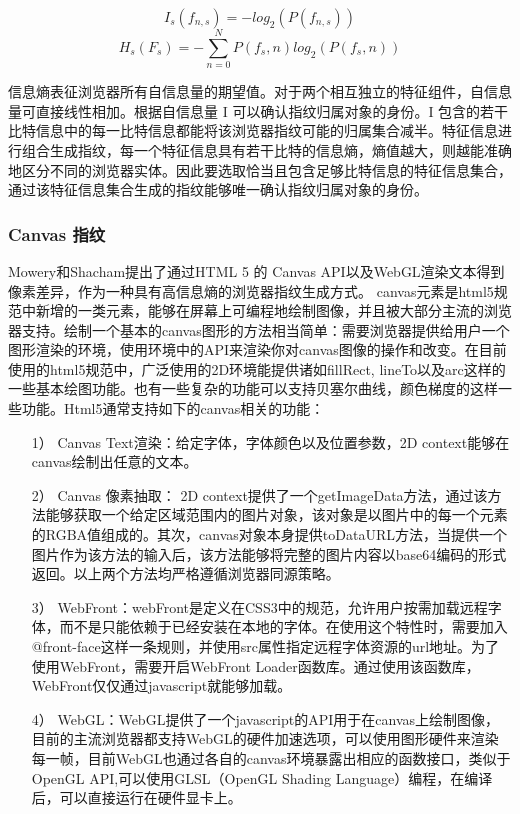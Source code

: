 \documentclass[doctor,privacy,twoside]{buaa_mac}
\begin{document}
\begin{equation}
I_s(f_{n,s})=-log_2(P(f_{n,s})) 
\end{equation}
\begin{equation}
H_s(F_s)=-\sum_{n=0}^{N}P(f_s,n)log_2(P(f_s,n)) 
\end{equation}


信息熵表征浏览器所有自信息量的期望值。对于两个相互独立的特征组件，自信息量可直接线性相加。根据自信息量 I 可以确认指纹归属对象的身份。I 包含的若干比特信息中的每一比特信息都能将该浏览器指纹可能的归属集合减半。特征信息进行组合生成指纹，每一个特征信息具有若干比特的信息熵，熵值越大，则越能准确地区分不同的浏览器实体。因此要选取恰当且包含足够比特信息的特征信息集合，通过该特征信息集合生成的指纹能够唯一确认指纹归属对象的身份。



\subsubsection{Canvas 指纹}
Mowery和Shacham提出了通过HTML 5 的 Canvas API以及WebGL渲染文本得到像素差异，作为一种具有高信息熵的浏览器指纹生成方式。
canvas元素是html5规范中新增的一类元素，能够在屏幕上可编程地绘制图像，并且被大部分主流的浏览器支持。绘制一个基本的canvas图形的方法相当简单：需要浏览器提供给用户一个图形渲染的环境，使用环境中的API来渲染你对canvas图像的操作和改变。在目前使用的html5规范中，广泛使用的2D环境能提供诸如fillRect, lineTo以及arc这样的一些基本绘图功能。也有一些复杂的功能可以支持贝塞尔曲线，颜色梯度的这样一些功能。Html5通常支持如下的canvas相关的功能：

\begin{itemize}
\item[1）] Canvas Text渲染：给定字体，字体颜色以及位置参数，2D context能够在canvas绘制出任意的文本。
\item[2）] Canvas 像素抽取： 2D context提供了一个getImageData方法，通过该方法能够获取一个给定区域范围内的图片对象，该对象是以图片中的每一个元素的RGBA值组成的。其次，canvas对象本身提供toDataURL方法，当提供一个图片作为该方法的输入后，该方法能够将完整的图片内容以base64编码的形式返回。以上两个方法均严格遵循浏览器同源策略。
\item[3）] WebFront：webFront是定义在CSS3中的规范，允许用户按需加载远程字体，而不是只能依赖于已经安装在本地的字体。在使用这个特性时，需要加入@front-face这样一条规则，并使用src属性指定远程字体资源的url地址。为了使用WebFront，需要开启WebFront Loader函数库。通过使用该函数库，WebFront仅仅通过javascript就能够加载。
 \item[4）] WebGL：WebGL提供了一个javascript的API用于在canvas上绘制图像，目前的主流浏览器都支持WebGL的硬件加速选项，可以使用图形硬件来渲染每一帧，目前WebGL也通过各自的canvas环境暴露出相应的函数接口，类似于OpenGL API,可以使用GLSL（OpenGL Shading Language）编程，在编译后，可以直接运行在硬件显卡上。
 \end{itemize}
\end{document}
